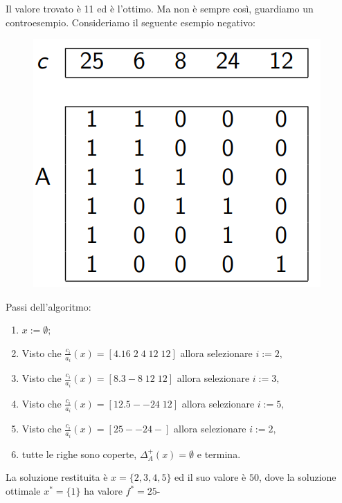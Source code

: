 \documentclass{article}
\begin{document}
    Il valore trovato è 11 ed è l'ottimo. Ma non è sempre così, guardiamo un controesempio.
    Consideriamo il seguente esempio negativo:
    \begin{figure}[H]
        \centering
        \includegraphics[scale=0.5]{images/set_cover_neg.png}
    \end{figure}
    Passi dell'algoritmo:
    \begin{enumerate}
        \item $x:=\emptyset;$
        \item Visto che $\frac{c_i}{a_i}(x)=[4.16\; 2\;4\; 12\; 12]$ allora selezionare $i:=2,$
        \item Visto che $\frac{c_i}{a_i}(x)=[8.3 - 8\;12\;12]$ allora selezionare $i:=3,$
        \item Visto che $\frac{c_i}{a_i}(x)=[12.5 - - 24\;12]$ allora selezionare $i:=5,$
        \item Visto che $\frac{c_i}{a_i}(x)=[25 - - 24 -]$ allora selezionare $i:=2,$
        \item tutte le righe sono coperte, $\Delta_A^+(x)=\emptyset$ e termina.
    \end{enumerate}

    La soluzione restituita è $x=\{2,3,4,5\}$ ed il suo valore è $50$, dove la soluzione
    ottimale $x^*=\{1\}$ ha valore $f^*=25$-
\end{document}
